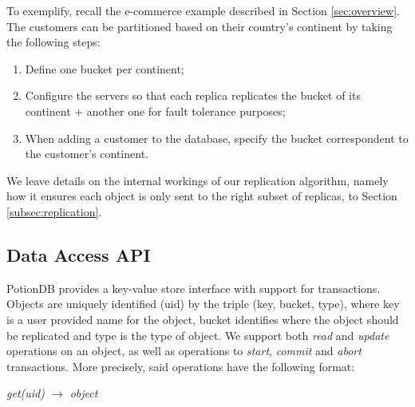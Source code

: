 \documentclass{vldb}
\newcommand{\grumbler}[2]{{\color{red}{\bf #1:} #2}}
\renewcommand{\grumbler}[2]{}
\newcommand{\andre}[1]{\grumbler{andre}{#1}}
\newcommand{\emphvspace}{0.5\baselineskip}
\newcommand{\firstblockemph}[1]{\vspace{\emphvspace}\hspace{2em}\emph{#1}}
\begin{document}
To exemplify, recall the e-commerce example described in Section \ref{sec:overview}.
The customers can be partitioned based on their country's continent by taking the following steps: 

\begin{enumerate}
	\item Define one bucket per continent;
	\item Configure the servers so that each replica replicates the bucket of its continent + another one for fault tolerance purposes;
	\item When adding a customer to the database, specify the bucket correspondent to the customer's continent.
\end{enumerate}

We leave details on the internal workings of our replication algorithm, namely how it ensures each object is only sent to the right subset of replicas, to Section \ref{subsec:replication}.





\subsection{Data Access API}

\andre{I repeated the uid explanation from Database Model and API to here... where should it stay?}

PotionDB provides a key-value store interface with support for transactions.
Objects are uniquely identified (uid) by the triple (key, bucket, type), where key is a user provided name for the object, bucket identifies where the object should be replicated and type is the type of object.
We support both \emph{read} and \emph{update} operations on an object, as well as operations to \emph{start}, \emph{commit} and \emph{abort} transactions.
More precisely, said operations have the following format:

\firstblockemph{get(uid) $\rightarrow$ object}
\end{document}
